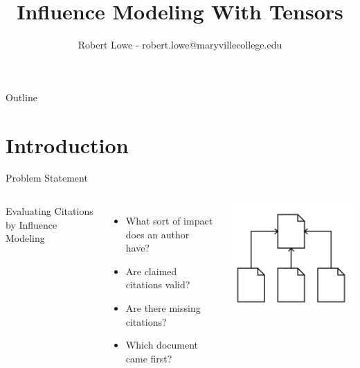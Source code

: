 \documentclass[handout]{beamer}
\title{Influence Modeling With Tensors}
\author{Robert Lowe - robert.lowe@maryvillecollege.edu}
\date[]{}
\begin{document}
\begin{frame}
  \titlepage
\end{frame}

\begin{frame}{Outline}
  \tableofcontents
\end{frame}





\section{Introduction}
\begin{frame}{Problem Statement}
    \begin{columns}
        Evaluating Citations by Influence Modeling
        \begin{itemize}[<+->]
            \item What sort of impact does an author have?
            \item Are claimed citations valid?
            \item Are there missing citations?
            \item Which document came first?
        \end{itemize}
        \includegraphics[width=\textwidth]{images/Citations}
    \end{columns}
\end{frame}
\end{document}
